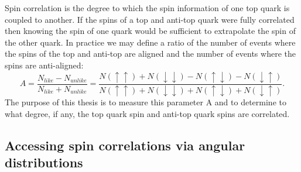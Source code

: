 Spin correlation is the degree to which the spin information of one top quark is coupled to another. If the spins of a top and anti-top quark were fully correlated then knowing the spin of one quark would be sufficient to extrapolate the spin of the other quark. In practice we may define a ratio of the number of events where the spins of the top and anti-top are aligned and the number of events where the spins are anti-aligned:
\begin{equation}
    A = \frac{N_{like} - N_{unlike}}{N_{like} + N_{unlike}} =
     \frac{N(\uparrow \uparrow) + N(\downarrow \downarrow) - N(\uparrow \downarrow) - N(\downarrow \uparrow)}
     {N(\uparrow \uparrow) + N(\downarrow \downarrow) + N(\uparrow \downarrow) + N(\downarrow \uparrow)}.
    \label{eq:Adef}
\end{equation}
The purpose of this thesis is to measure this parameter A and to determine to what degree, if any, the top quark spin and anti-top quark spins are correlated. 

\subsection{Accessing spin correlations via angular distributions}

